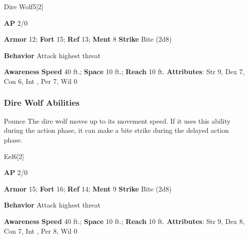 \begin{monsection}{Dire Wolf}{5}[2]
\vspace{-1em}\vspace{-1em}
\begin{spellcontent}
\begin{spelltargetinginfo}
{\textbf{AP} 2/0}

\pari \textbf{Armor} 12;
\textbf{Fort} 15;
\textbf{Ref} 13;
\textbf{Ment} 8
\pari \textbf{Strike} Bite  (2d8)



\pari \textbf{Behavior} Attack highest threat
\end{spelltargetinginfo}
\end{spellcontent}

\begin{monsterfooter}
\pari \textbf{Awareness} 
\pari \textbf{Speed} 40 ft.;
\textbf{Space} 10 ft.;
\textbf{Reach} 10 ft.
\pari \textbf{Attributes}:
Str 9,
Dex 7,
Con 6,
Int ,
Per 7,
Wil 0
\end{monsterfooter}
\end{monsection}


\subsubsection{Dire Wolf Abilities}

\begin{freeability}{Pounce}
The dire wolf moves up to its movement speed.
If it uses this ability during the action phase, it can make a bite strike during the delayed action phase.
\end{freeability}

\begin{monsection}{Eel}{6}[2]
\vspace{-1em}\vspace{-1em}
\begin{spellcontent}
\begin{spelltargetinginfo}
{\textbf{AP} 2/0}

\pari \textbf{Armor} 15;
\textbf{Fort} 16;
\textbf{Ref} 14;
\textbf{Ment} 9
\pari \textbf{Strike} Bite  (2d8)



\pari \textbf{Behavior} Attack highest threat
\end{spelltargetinginfo}
\end{spellcontent}

\begin{monsterfooter}
\pari \textbf{Awareness} 
\pari \textbf{Speed} 40 ft.;
\textbf{Space} 10 ft.;
\textbf{Reach} 10 ft.
\pari \textbf{Attributes}:
Str 9,
Dex 8,
Con 7,
Int ,
Per 8,
Wil 0
\end{monsterfooter}
\end{monsection}

